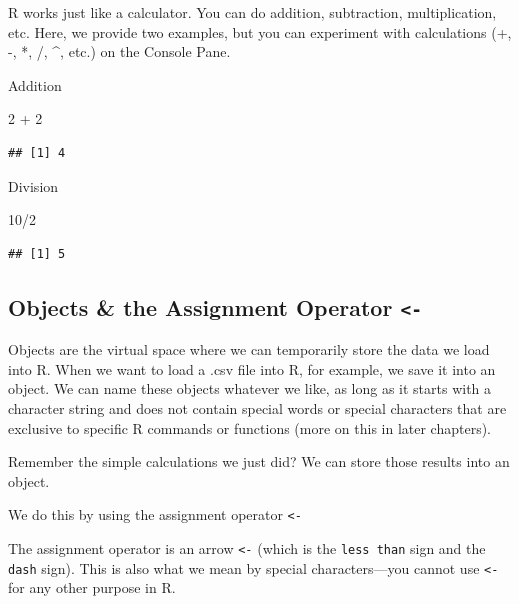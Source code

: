 \documentclass[
]{book}
\newenvironment{Shaded}{\begin{snugshade}}{\end{snugshade}}
\newcommand{\DecValTok}[1]{\textcolor[rgb]{0.00,0.00,0.81}{#1}}
\newcommand{\SpecialCharTok}[1]{\textcolor[rgb]{0.00,0.00,0.00}{#1}}
\begin{document}
R works just like a calculator. You can do addition, subtraction, multiplication, etc. Here, we provide two examples, but you can experiment with calculations (+, -, *, /, \^{}, etc.) on the Console Pane.

Addition

\begin{Shaded}
\begin{Highlighting}[]
\DecValTok{2} \SpecialCharTok{+} \DecValTok{2}
\end{Highlighting}
\end{Shaded}

\begin{verbatim}
## [1] 4
\end{verbatim}

Division

\begin{Shaded}
\begin{Highlighting}[]
\DecValTok{10}\SpecialCharTok{/}\DecValTok{2}
\end{Highlighting}
\end{Shaded}

\begin{verbatim}
## [1] 5
\end{verbatim}

\hypertarget{objects-the-assignment-operator--}{%
\subsection{\texorpdfstring{Objects \& the Assignment Operator \texttt{\textless{}-}}{Objects \& the Assignment Operator \textless-}}\label{objects-the-assignment-operator--}}

Objects are the virtual space where we can temporarily store the data we load into R. When we want to load a .csv file into R, for example, we save it into an object. We can name these objects whatever we like, as long as it starts with a character string and does not contain special words or special characters that are exclusive to specific R commands or functions (more on this in later chapters).

Remember the simple calculations we just did? We can store those results into an object.

We do this by using the assignment operator \texttt{\textless{}-}

The assignment operator is an arrow \texttt{\textless{}-} (which is the \texttt{less\ than} sign and the \texttt{dash} sign). This is also what we mean by special characters---you cannot use \texttt{\textless{}-} for any other purpose in R.
\end{document}

